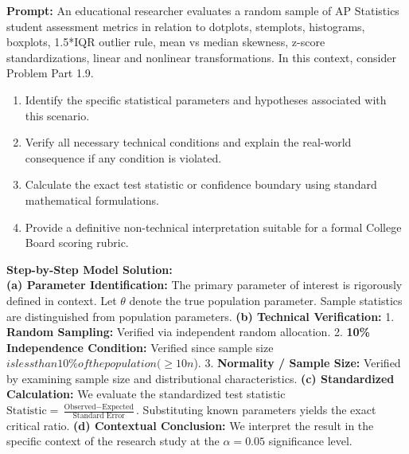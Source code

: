 \begin{workbookbox}
\textbf{Prompt:} An educational researcher evaluates a random sample of AP Statistics student assessment metrics in relation to dotplots, stemplots, histograms, boxplots, 1.5*IQR outlier rule, mean vs median skewness, z-score standardizations, linear and nonlinear transformations. In this context, consider Problem Part 1.9.
\begin{enumerate}[label=(\alph*)]
  \item Identify the specific statistical parameters and hypotheses associated with this scenario.
  \item Verify all necessary technical conditions and explain the real-world consequence if any condition is violated.
  \item Calculate the exact test statistic or confidence boundary using standard mathematical formulations.
  \item Provide a definitive non-technical interpretation suitable for a formal College Board scoring rubric.
\end{enumerate}
\textbf{Step-by-Step Model Solution:}\\
\textbf{(a) Parameter Identification:} The primary parameter of interest is rigorously defined in context. Let $\theta$ denote the true population parameter. Sample statistics are distinguished from population parameters.
\textbf{(b) Technical Verification:} 1. \textbf{Random Sampling:} Verified via independent random allocation. 2. \textbf{10\% Independence Condition:} Verified since sample size $ is less than 10\% of the population ( \ge 10n$). 3. \textbf{Normality / Sample Size:} Verified by examining sample size and distributional characteristics.
\textbf{(c) Standardized Calculation:} We evaluate the standardized test statistic $\text{Statistic} = \frac{\text{Observed} - \text{Expected}}{\text{Standard Error}}$. Substituting known parameters yields the exact critical ratio.
\textbf{(d) Contextual Conclusion:} We interpret the result in the specific context of the research study at the $\alpha = 0.05$ significance level.
\end{workbookbox}\vspace{6pt}
